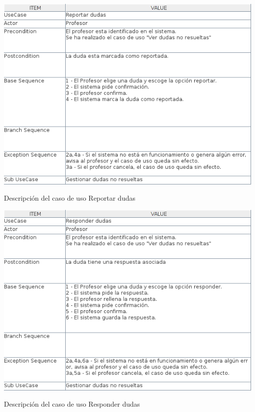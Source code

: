 \documentclass[openright,twoside,10pt]{book}
\begin{document}
    \vspace*{\fill}
    
    \newpage
    
    \vspace*{\fill}
    
    \begin{table}[H]
        \begin{center}
            \includegraphics[width=\textwidth]{img/astah/analisis/casos_de_uso/useCase10.png}
        \end{center}
        \caption{Descripción del caso de uso Reportar dudas}
    \end{table}
    
    \vspace*{\fill}
    
    \newpage
    
    \vspace*{\fill}
    
    \begin{table}[H]
        \begin{center}
            \includegraphics[width=\textwidth]{img/astah/analisis/casos_de_uso/useCase11.png}
        \end{center}
        \caption{Descripción del caso de uso Responder dudas}
    \end{table}
    
\end{document}
